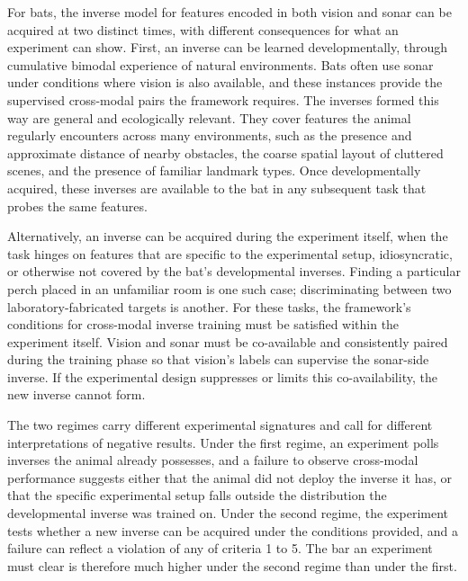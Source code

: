 \documentclass[11pt]{article}
\begin{document}
For bats, the inverse model for features encoded in both vision and sonar can be acquired at two distinct times, with different consequences for what an experiment can show. First, an inverse can be learned developmentally, through cumulative bimodal experience of natural environments. Bats often use sonar under conditions where vision is also available, and these instances provide the supervised cross-modal pairs the framework requires. The inverses formed this way are general and ecologically relevant. They cover features the animal regularly encounters across many environments, such as the presence and approximate distance of nearby obstacles, the coarse spatial layout of cluttered scenes, and the presence of familiar landmark types. Once developmentally acquired, these inverses are available to the bat in any subsequent task that probes the same features.


Alternatively, an inverse can be acquired during the experiment itself, when the task hinges on features that are specific to the experimental setup, idiosyncratic, or otherwise not covered by the bat's developmental inverses. Finding a particular perch placed in an unfamiliar room is one such case; discriminating between two laboratory-fabricated targets is another. For these tasks, the framework's conditions for cross-modal inverse training must be satisfied within the experiment itself. Vision and sonar must be co-available and consistently paired during the training phase so that vision's labels can supervise the sonar-side inverse. If the experimental design suppresses or limits this co-availability, the new inverse cannot form.


The two regimes carry different experimental signatures and call for different interpretations of negative results. Under the first regime, an experiment polls inverses the animal already possesses, and a failure to observe cross-modal performance suggests either that the animal did not deploy the inverse it has, or that the specific experimental setup falls outside the distribution the developmental inverse was trained on. Under the second regime, the experiment tests whether a new inverse can be acquired under the conditions provided, and a failure can reflect a violation of any of criteria 1 to 5. The bar an experiment must clear is therefore much higher under the second regime than under the first.
\end{document}
